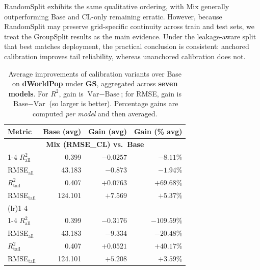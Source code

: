 \documentclass[pdflatex,sn-basic,Numbered]{sn-jnl}
\renewcommand{\arraystretch}{1.1}
\begin{document}
RandomSplit exhibits the same qualitative ordering, with Mix generally outperforming Base and CL-only remaining erratic. However, because RandomSplit may preserve grid-specific continuity across train and test sets, we treat the GroupSplit results as the main evidence. Under the leakage-aware split that best matches deployment, the practical conclusion is consistent: anchored calibration improves tail reliability, whereas unanchored calibration does not.


\begin{table}[htbp]
\centering
\small
\setlength{\tabcolsep}{5pt}
\renewcommand{\arraystretch}{1.10}
\caption{Average improvements of calibration variants over Base on \textbf{dWorldPop} under \textbf{GS}, aggregated across \textbf{seven models}. For $R^2$, gain is $\text{Var}-\text{Base}$; for RMSE, gain is $\text{Base}-\text{Var}$ (so larger is better). Percentage gains are computed \emph{per model} and then averaged.}
\label{tab:dwp_gs_avg_gain}
\begin{tabular}{lrrr}
\toprule
\textbf{Metric} & \textbf{Base (avg)} & \textbf{Gain (avg)} & \textbf{Gain (\% avg)} \\
\midrule

\multicolumn{4}{c}{\textbf{Mix (RMSE\_CL) vs.\ Base}} \\
\cmidrule(lr){1-4}
$R^2_{\mathrm{all}}$    & 0.399   & $-0.0257$  & $-8.11\%$ \\
RMSE$_{\mathrm{all}}$   & 43.183  & $-0.873$   & $-1.94\%$ \\
$R^2_{\mathrm{tail}}$   & 0.407   & $\mathbf{+0.0763}$  & $\mathbf{+69.68\%}$ \\
RMSE$_{\mathrm{tail}}$  & 124.101 & $\mathbf{+7.569}$   & $\mathbf{+5.37\%}$ \\
\addlinespace
\cmidrule(lr){1-4}
\multicolumn{4}{c}{\textbf{CL-only vs.\ Base}} \\
\cmidrule(lr){1-4}
$R^2_{\mathrm{all}}$    & 0.399   & $-0.3176$  & $-109.59\%$ \\
RMSE$_{\mathrm{all}}$   & 43.183  & $-9.334$   & $-20.48\%$ \\
$R^2_{\mathrm{tail}}$   & 0.407   & $+0.0521$  & $+40.17\%$ \\
RMSE$_{\mathrm{tail}}$  & 124.101 & $+5.208$   & $+3.59\%$ \\

\bottomrule
\end{tabular}
\end{table}
\end{document}

